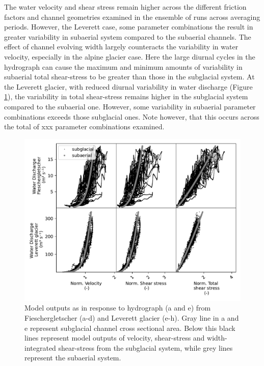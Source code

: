 \documentclass[draft]{agujournal2019}
\begin{document}
The water velocity and shear stress remain higher across the different friction factors and channel geometries examined in the ensemble of runs across averaging periods.
However, the Leverett case, some parameter combinations the result in greater variability in subaerial system compared to the subaerial channels.
The effect of channel evolving width largely counteracts the variability in water velocity, especially in the alpine glacier case.
Here the large diurnal cycles in the hydrograph can cause the maximum and minimum amounts of variability in subaerial total shear-stress to be greater than those in the subglacial system.
At the Leverett glacier, with reduced diurnal variability in water discharge (Figure\,\ref{fig:model_outs}), the variability in total shear-stress remains higher in the subglacial system compared to the subaerial one.
However, some variability in subaerial parameter combinations exceeds those subglacial ones.
Note however, that this occurs across the total of xxx parameter combinations examined.









\begin{center}
  \begin{figure}[H]
    \includegraphics[width=0.8\linewidth]{model_outputs.pdf}
    \caption{Model outputs as in response to hydrograph (a and e) from Fieschergletscher (a-d) and Leverett glacier (e-h). Gray line in a and e represent subglacial channel cross sectional area. Below this black lines represent model outputs of velocity, shear-stress and width-integrated shear-stress from the subglacial system, while grey lines represent the subaerial system. } 
    \label{fig:model_outs}
  \end{figure}
\end{center}
\end{document}
